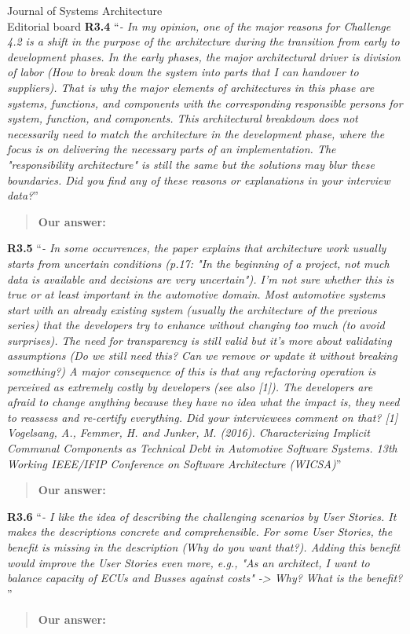 \documentclass[a4paper,10pt]{letter}
\begin{document}
\begin{letter}{Journal of Systems Architecture\\
    Editorial board}
\textbf{R3.4} ``\textit{- In my opinion, one of the major reasons for Challenge 4.2 is a shift in the purpose of the architecture during the transition from early to development phases. In the early phases, the major architectural driver is division of labor (How to break down the system into parts that I can handover to suppliers). That is why the major elements of architectures in this phase are systems, functions, and components with the corresponding responsible persons for system, function, and components. This architectural breakdown does not necessarily need to match the architecture in the development phase, where the focus is on delivering the necessary parts of an implementation. The "responsibility architecture" is still the same but the solutions may blur these boundaries. Did you find any of these reasons or explanations in your interview data?}''
\begin{quote}
\textbf{Our answer: }
\end{quote}

\textbf{R3.5} ``\textit{- In some occurrences, the paper explains that architecture work usually starts from uncertain conditions (p.17: "In the beginning of a project, not much data is available and decisions are very uncertain"). I'm not sure whether this is true or at least important in the automotive domain. Most automotive systems start with an already existing system (usually the architecture of the previous series) that the developers try to enhance without changing too much (to avoid surprises). The need for transparency is still valid but it's more about validating assumptions (Do we still need this? Can we remove or update it without breaking something?) A major consequence of this is that any refactoring operation is perceived as extremely costly by developers (see also [1]). The developers are afraid to change anything because they have no idea what the impact is, they need to reassess and re-certify everything. Did your interviewees comment on that? 
[1] Vogelsang, A., Femmer, H. and Junker, M. (2016). Characterizing Implicit Communal Components as Technical Debt in Automotive Software Systems. 13th Working IEEE/IFIP Conference on Software Architecture (WICSA)}''
\begin{quote}
\textbf{Our answer: }
\end{quote}

\textbf{R3.6} ``\textit{- I like the idea of describing the challenging scenarios by User Stories. It makes the descriptions concrete and comprehensible. For some User Stories, the benefit is missing in the description (Why do you want that?). Adding this benefit would improve the User Stories even more, e.g., "As an architect, I want to balance capacity of ECUs and Busses against costs" -> Why? What is the benefit? }''
\begin{quote}
\textbf{Our answer: }
\end{quote}


\end{letter}
\end{document}
